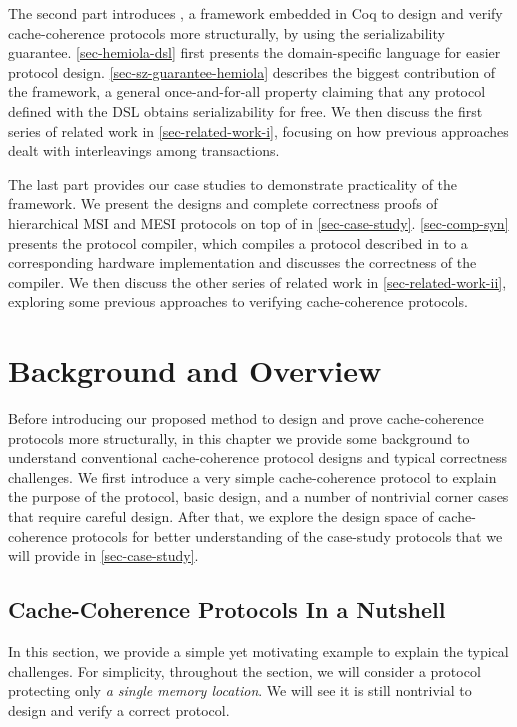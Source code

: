 The second part introduces \hemiola{}, a framework embedded in Coq to design and verify cache-coherence protocols more structurally, by using the serializability guarantee.
\autoref{sec-hemiola-dsl} first presents the \hemiola{} domain-specific language for easier protocol design.
\autoref{sec-sz-guarantee-hemiola} describes the biggest contribution of the framework, a general once-and-for-all property claiming that any protocol defined with the DSL obtains serializability for free.
We then discuss the first series of related work in \autoref{sec-related-work-i}, focusing on how previous approaches dealt with interleavings among transactions.

The last part provides our case studies to demonstrate practicality of the framework.
We present the designs and complete correctness proofs of hierarchical MSI and MESI protocols on top of \hemiola{} in \autoref{sec-case-study}.
\autoref{sec-comp-syn} presents the protocol compiler, which compiles a protocol described in \hemiola{} to a corresponding hardware implementation and discusses the correctness of the compiler.
We then discuss the other series of related work in \autoref{sec-related-work-ii}, exploring some previous approaches to verifying cache-coherence protocols.

\chapter{Background and Overview}
\label{sec-background}

Before introducing our proposed method to design and prove cache-coherence protocols more structurally, in this chapter we provide some background to understand conventional cache-coherence protocol designs and typical correctness challenges.
We first introduce a very simple cache-coherence protocol to explain the purpose of the protocol, basic design, and a number of nontrivial corner cases that require careful design.
After that, we explore the design space of cache-coherence protocols for better understanding of the case-study protocols that we will provide in \autoref{sec-case-study}.

\section{Cache-Coherence Protocols In a Nutshell}
\label{sec-nutshell}

In this section, we provide a simple yet motivating example to explain the typical challenges.
For simplicity, throughout the section, we will consider a protocol protecting only \emph{a single memory location}.
We will see it is still nontrivial to design and verify a correct protocol.


